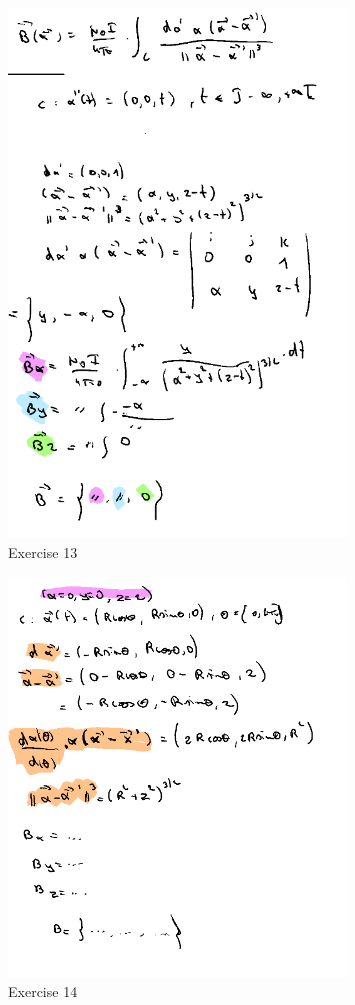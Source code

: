 \documentclass[a4paper]{report}
\begin{document}
\begin{figure}[H]
	\centering
	\includegraphics[width=0.8\textwidth]{assets/huis_6_ex_13.png}
	\caption{Exercise 13}
	\label{fig:huis_6_ex_13}
\end{figure}


\begin{figure}[H]
	\centering
	\includegraphics[width=0.8\textwidth]{assets/2024-11-10-11-45-23.png}
	\caption{Exercise 14}
	\label{fig:2024-11-10-11-45-23}
\end{figure}
\end{document}
